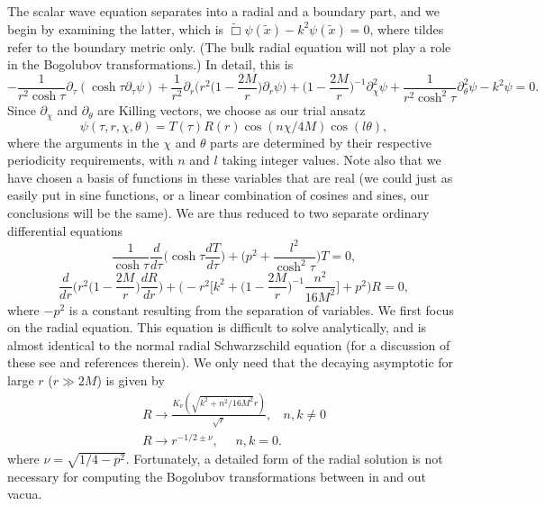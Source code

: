 \documentclass[a4paper,aps,prd,preprintnumbers,groupedaddress]{revtex4}
\begin{document}
The scalar wave equation separates into a radial and a boundary part, and we begin by examining the latter, which is $\tilde{\Box} \psi (\tilde{x}) - k^2 \psi
(\tilde{x}) =0$, where tildes refer to the boundary metric only.  (The bulk radial equation will not play a role in the Bogolubov transformations.)    In detail, this is
\begin{equation} \label{boundary s bubble wave equation}
- \frac{1}{r^2 \cosh \tau} \partial _\tau (\cosh \tau \partial _\tau \psi) + \frac{1}{r^2} \partial _r \biggl( r^2 \biggl( 1 - \frac{2M}{r}
\biggr) \partial _r \psi \biggr) + \biggl (1 - \frac{2M}{r} \biggr) ^{-1} \partial ^2 _\chi \psi + \frac{1}{r^2 \cosh ^2 \tau} \partial
_\theta ^2 \psi - k^2 \psi = 0.
\end{equation}
Since $\partial _\chi$ and $\partial _\theta$ are Killing vectors, we choose as our trial ansatz
\begin{equation} \label{s ansatz}
\psi (\tau, r , \chi, \theta) = T(\tau) R(r) \cos(n\chi / 4M) \cos(l \theta) ,
\end{equation}
where the arguments in the $\chi$ and $\theta$ parts are determined by their respective periodicity requirements, with $n$ and $l$ taking
integer values. Note also that we have chosen a basis of functions in these variables that are real (we could just as easily put in sine
functions, or a linear combination of cosines and sines, our conclusions will be the same). We are thus reduced to two separate ordinary
differential equations
\begin{equation} \label{s t equation}
\frac{1}{ \cosh \tau} \frac{d}{d \tau} \biggl( \cosh \tau \frac{dT}{d \tau} \biggr) +\biggl(p^2 + \frac{l^2}{\cosh ^2 \tau} \biggr)T =0 ,
\end{equation}
\begin{equation} \label{s r equation}
\frac{d}{dr} \biggl( r^2 \biggl( 1- \frac{2M}{r} \biggr) \frac{dR}{dr} \biggr) + \biggl(- r^2 \biggl[k^2 + \biggl(1-\frac{2M}{r}\biggr)^{-1}
\frac{n^2}{16 M^2}\biggr] +p^2 \biggr) R =0 ,
\end{equation}
where $-p^2$ is a constant resulting from the separation of variables. We first focus on the radial equation. This equation is difficult to
solve analytically, and is almost identical to the normal radial Schwarzschild equation (for a discussion of these see
\cite{page76,jensen86,bd} and references therein). We only need that the decaying asymptotic for large $r$ ($r\gg 2M$) is given by
\begin{eqnarray} \label{s r asymptotic}
R \rightarrow  \frac{K_\nu (\sqrt{k^2+n^2/16M^2} r )}{\sqrt{r}} , \ \ \ \ n, k \neq 0 \\
R \rightarrow r ^{- 1/2 \pm  \nu} , \ \ \ \ \ \ n,k =0 .
\end{eqnarray}
where $\nu = \sqrt{1/4 - p^2}$.   Fortunately, a detailed form of the radial solution is not necessary for computing the Bogolubov
transformations between in and out vacua.
\end{document}
